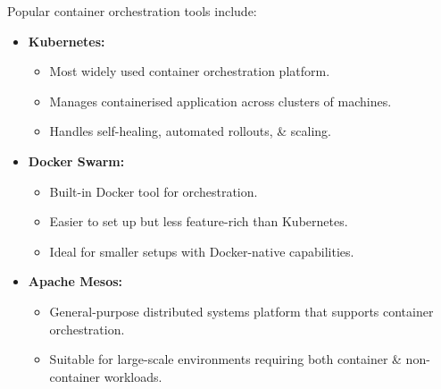 \documentclass[a4paper,11pt]{article}
\begin{document}
Popular container orchestration tools include:
\begin{itemize}
    \item   \textbf{Kubernetes:}
            \begin{itemize}
                \item   Most widely used container orchestration platform.
                \item   Manages containerised application across clusters of machines.
                \item   Handles self-healing, automated rollouts, \& scaling.
            \end{itemize}
    \item   \textbf{Docker Swarm:}
            \begin{itemize}
                \item   Built-in Docker tool for orchestration.
                \item   Easier to set up but less feature-rich than Kubernetes.
                \item   Ideal for smaller setups with Docker-native capabilities.
            \end{itemize}
    \item   \textbf{Apache Mesos:}
            \begin{itemize}
                \item   General-purpose distributed systems platform that supports container orchestration.
                \item   Suitable for large-scale environments requiring both container \& non-container workloads.
            \end{itemize}
\end{itemize}
\end{document}
